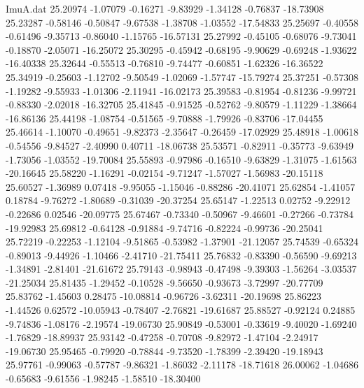 \begin{filecontents}{ImuA.dat}
  25.20974   -1.07079   -0.16271   -9.83929   -1.34128   -0.76837  -18.73908
  25.23287   -0.58146   -0.50847   -9.67538   -1.38708   -1.03552  -17.54833
  25.25697   -0.40558   -0.61496   -9.35713   -0.86040   -1.15765  -16.57131
  25.27992   -0.45105   -0.68076   -9.73041   -0.18870   -2.05071  -16.25072
  25.30295   -0.45942   -0.68195   -9.90629   -0.69248   -1.93622  -16.40338
  25.32644   -0.55513   -0.76810   -9.74477   -0.60851   -1.62326  -16.36522
  25.34919   -0.25603   -1.12702   -9.50549   -1.02069   -1.57747  -15.79274
  25.37251   -0.57308   -1.19282   -9.55933   -1.01306   -2.11941  -16.02173
  25.39583   -0.81954   -0.81236   -9.99721   -0.88330   -2.02018  -16.32705
  25.41845   -0.91525   -0.52762   -9.80579   -1.11229   -1.38664  -16.86136
  25.44198   -1.08754   -0.51565   -9.70888   -1.79926   -0.83706  -17.04455
  25.46614   -1.10070   -0.49651   -9.82373   -2.35647   -0.26459  -17.02929
  25.48918   -1.00618   -0.54556   -9.84527   -2.40990    0.40711  -18.06738
  25.53571   -0.82911   -0.35773   -9.63949   -1.73056   -1.03552  -19.70084
  25.55893   -0.97986   -0.16510   -9.63829   -1.31075   -1.61563  -20.16645
  25.58220   -1.16291   -0.02154   -9.71247   -1.57027   -1.56983  -20.15118
  25.60527   -1.36989    0.07418   -9.95055   -1.15046   -0.88286  -20.41071
  25.62854   -1.41057    0.18784   -9.76272   -1.80689   -0.31039  -20.37254
  25.65147   -1.22513    0.02752   -9.22912   -0.22686    0.02546  -20.09775
  25.67467   -0.73340   -0.50967   -9.46601   -0.27266   -0.73784  -19.92983
  25.69812   -0.64128   -0.91884   -9.74716   -0.82224   -0.99736  -20.25041
  25.72219   -0.22253   -1.12104   -9.51865   -0.53982   -1.37901  -21.12057
  25.74539   -0.65324   -0.89013   -9.44926   -1.10466   -2.41710  -21.75411
  25.76832   -0.83390   -0.56590   -9.69213   -1.34891   -2.81401  -21.61672
  25.79143   -0.98943   -0.47498   -9.39303   -1.56264   -3.03537  -21.25034
  25.81435   -1.29452   -0.10528   -9.56650   -0.93673   -3.72997  -20.77709
  25.83762   -1.45603    0.28475  -10.08814   -0.96726   -3.62311  -20.19698
  25.86223   -1.44526    0.62572  -10.05943   -0.78407   -2.76821  -19.61687
  25.88527   -0.92124    0.24885   -9.74836   -1.08176   -2.19574  -19.06730
  25.90849   -0.53001   -0.33619   -9.40020   -1.69240   -1.76829  -18.89937
  25.93142   -0.47258   -0.70708   -9.82972   -1.47104   -2.24917  -19.06730
  25.95465   -0.79920   -0.78844   -9.73520   -1.78399   -2.39420  -19.18943
  25.97761   -0.99063   -0.57787   -9.86321   -1.86032   -2.11178  -18.71618
  26.00062   -1.04686   -0.65683   -9.61556   -1.98245   -1.58510  -18.30400

\end{filecontents}
